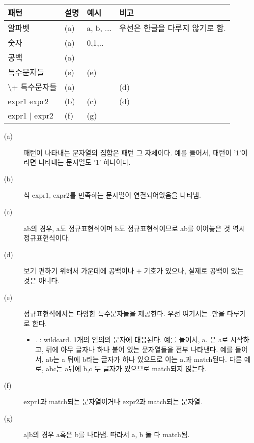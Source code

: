\documentclass[twoside]{article}
\begin{document}
\begin{table}[h]
\begin{tabular}{|l|l|l|l|}
\hline
\rowcolor[HTML]{C0C0C0} 
패턴 & 설명 & 예시 & 비고 \\ \hline
알파벳 &  (a) & a, b, ...   & 우선은 한글을 다루지 않기로 함. \\ \hline
숫자 & (a)  & 0,1,..   &  \\ \hline
공백 & (a)  &  &  \\ \hline
특수문자들 & (e)  & (e)   &  \\ \hline
\textbackslash + 특수문자들 & (a)  &   & (d) \\ \hline
expr1 expr2  & (b) & (c)  & (d) \\ \hline
expr1 | expr2  & (f) & (g)  &  \\ \hline
\end{tabular}
\end{table}

\begin{description}
\item[(a)] 패턴이 나타내는 문자열의 집합은 패턴 그 자체이다. 예를 들어서, 패턴이 '1'이라면 나타내는 문자열도 '1' 하나이다. 
\item[(b)] 식 expr1, expr2를 만족하는 문자열이 연결되어있음을 나타냄.
\item[(c)] ab의 경우, a도 정규표현식이며 b도 정규표현식이므로 ab를 이어놓은 것 역시 정규표현식이다. 
\item[(d)] 보기 편하기 위해서 가운데에 공백이나 + 기호가 있으나, 실제로 공백이 있는 것은 아니다. 
\item[(e)] 정규표현식에서는 다양한 특수문자들을 제공한다. 우선 여기서는 .만을 다루기로 한다. 
\begin{itemize} 
\item . : wildcard. 1개의 임의의 문자에 대응된다. 예를 들어서, a. 은 a로 시작하고, 뒤에 아무 글자나 하나 붙어 있는 문자열들을 전부 나타낸다. 예를 들어서, ab는 a 뒤에 b라는 글자가 하나 있으므로 이는 a.과 match된다. 다른 예로, abc는 a뒤에 b,c 두 글자가 있으므로 match되지 않는다. 
\end{itemize}
\item[(f)] expr1과 match되는 문자열이거나 expr2과 match되는 문자열. 
\item[(g)] a|b의 경우 a혹은 b를 나타냄. 따라서 a, b 둘 다 match됨. 

\end{description}
\end{document}
